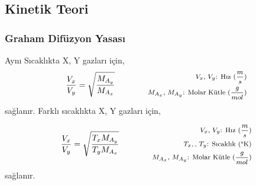 \subsection{Kinetik Teori}

\subsubsection*{Graham Difüzyon Yasası}

Aynı Sıcaklıkta X, Y gazları için,
\begin{equation}
    \frac{V_x}{V_y} = \sqrt{\frac{M_{A_y}}{M_{A_x}}} \qquad \qquad \parbox{4cm}{\footnotesize$\begin{aligned}
        V_x\text{, }V_y\text{: Hız } (\frac{m}{s}) \\
        M_{A_x}\text{, }M_{A_y}\text{: Molar Kütle (} \frac{g}{mol} \text{)}
\end{aligned}$}
\end{equation}
sağlanır. Farklı sıcaklıkta X, Y gazları için,

\begin{equation}
    \frac{V_x}{V_y} = \sqrt{\frac{T_x M_{A_y}}{T_y M_{A_x}}} \qquad \qquad \parbox{4cm}{\footnotesize$\begin{aligned}
        V_x\text{, }V_y\text{: Hız } (\frac{m}{s}) \\
        T_x,\text{, }T_y\text{: Sıcaklık } (\text{\textdegree K}) \\
        M_{A_x}\text{, }M_{A_y}\text{: Molar Kütle (} \frac{g}{mol} \text{)}
\end{aligned}$}
\end{equation}
sağlanır.